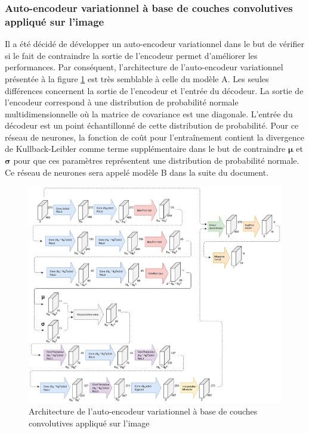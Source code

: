\subsubsection{Auto-encodeur variationnel à base de couches convolutives appliqué sur l'image}
    Il a été décidé de développer un auto-encodeur variationnel dans le but de vérifier si le fait de contraindre la sortie de l'encodeur permet d'améliorer les performances. Par conséquent, l'architecture de l'auto-encodeur variationnel présentée à la figure \ref{fig:architecture_cnn_vae} est très semblable à celle du modèle A. Les seules différences concernent la sortie de l'encodeur et l'entrée du décodeur. La sortie de l'encodeur correspond à une distribution de probabilité normale multidimensionnelle où la matrice de covariance est une diagonale. L'entrée du décodeur est un point échantillonné de cette distribution de probabilité. Pour ce réseau de neurones, la fonction de coût pour l'entraînement contient la divergence de Kullback-Leibler comme terme supplémentaire dans le but de contraindre \(\boldsymbol{\mu}\) et \(\boldsymbol{\sigma}\) pour que ces paramètres représentent une distribution de probabilité normale. Ce réseau de neurones sera appelé modèle B dans la suite du document.
    \begin{figure}
        \centering
        \includegraphics[width=16.6cm]{images/Architecture_CnnVae.png}
        \caption{Architecture de l'auto-encodeur variationnel à base de couches convolutives appliqué sur l'image}
        \label{fig:architecture_cnn_vae}
    \end{figure}

